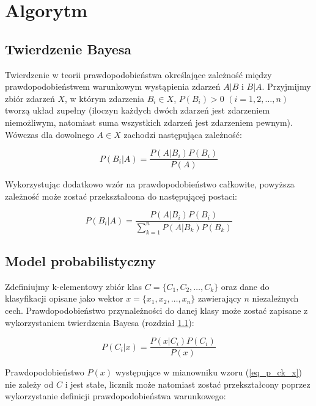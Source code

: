 \section{Algorytm}

\subsection{Twierdzenie Bayesa}
\label{subsec_tw_bayesa}
Twierdzenie w teorii prawdopodobieństwa określające zależność między prawdopodobieństwem warunkowym wystąpienia zdarzeń $A|B$ i $B|A$. Przyjmijmy zbiór zdarzeń $X$, w którym zdarzenia $B_i \in X$, $P(B_i)>0$ ${(i=1,2, \dots , n)}$ tworzą układ zupełny (iloczyn każdych dwóch zdarzeń jest zdarzeniem niemożliwym, natomiast suma wszystkich zdarzeń jest zdarzeniem pewnym). Wówczas dla dowolnego $A \in X$ zachodzi następująca zależność:

	\begin{equation}
	\label{eq_tw_bayesa_1}
		P(B_i | A) = \frac{P(A | B_i) P(B_i)}{P(A)}
	\end{equation}

Wykorzystując dodatkowo wzór na prawdopodobieństwo całkowite, powyższa zależność może zostać przekształcona do następującej postaci:

	\begin{equation}
	\label{eq_tw_bayesa_2}
		P(B_i | A) = \frac{P(A | B_i) P(B_i)}{\sum_{k=1}^{n} P(A | B_k)P(B_k)}
	\end{equation}


\subsection{Model probabilistyczny}
\label{subsec_model}

Zdefiniujmy k-elementowy zbiór klas $C = {\{C_1, C_2, \dots, C_k\}}$ oraz dane do klasyfikacji opisane jako wektor ${x = \{x_1, x_2, \dots, x_n\}}$ zawierający $n$ niezależnych cech. Prawdopodobieństwo przynależności do danej klasy może zostać zapisane z wykorzystaniem twierdzenia Bayesa (rozdział \ref{subsec_tw_bayesa}):

	\begin{equation}
	\label{eq_p_ck_x}
		P(C_i | x) = \frac{P(x | C_i) P(C_i)}{P(x)}
	\end{equation}

Prawdopodobieństwo $P(x)$ występujące w mianowniku wzoru (\ref{eq_p_ck_x}) nie zależy od $C$ i jest stałe, licznik może natomiast zostać przekształcony poprzez wykorzystanie definicji prawdopodobieństwa warunkowego:

